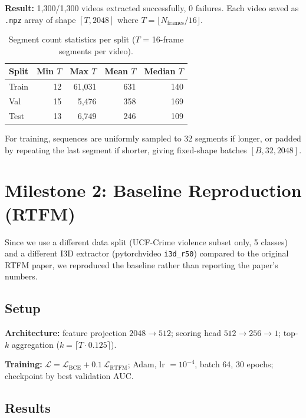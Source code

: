 \documentclass[11pt]{article}
\begin{document}
\textbf{Result:} 1,300/1,300 videos extracted successfully, 0 failures. Each video saved as \texttt{.npz} array of shape $[T, 2048]$ where $T = \lfloor N_\text{frames} / 16 \rfloor$.

\begin{table}[h]
\centering
\small
\begin{tabular}{lrrrr}
\toprule
\textbf{Split} & \textbf{Min $T$} & \textbf{Max $T$} & \textbf{Mean $T$} & \textbf{Median $T$} \\
\midrule
Train &  12 & 61,031 & 631 & 140 \\
Val   &  15 &  5,476 & 358 & 169 \\
Test  &  13 &  6,749 & 246 & 109 \\
\bottomrule
\end{tabular}
\caption{Segment count statistics per split ($T$ = 16-frame segments per video).}
\label{tab:feature_stats}
\end{table}

For training, sequences are uniformly sampled to 32 segments if longer, or padded by repeating the last segment if shorter, giving fixed-shape batches $[B, 32, 2048]$.

\section{Milestone 2: Baseline Reproduction (RTFM)}

Since we use a different data split (UCF-Crime violence subset only, 5 classes) and a different I3D extractor (pytorchvideo \texttt{i3d\_r50}) compared to the original RTFM paper, we reproduced the baseline rather than reporting the paper's numbers.

\subsection{Setup}

\textbf{Architecture:} feature projection $2048 \!\to\! 512$; scoring head $512 \!\to\! 256 \!\to\! 1$; top-$k$ aggregation ($k = \lceil T \cdot 0.125 \rceil$).

\textbf{Training:} $\mathcal{L} = \mathcal{L}_\text{BCE} + 0.1\,\mathcal{L}_\text{RTFM}$; Adam, lr $= 10^{-4}$, batch 64, 30 epochs; checkpoint by best validation AUC.

\subsection{Results}
\end{document}
